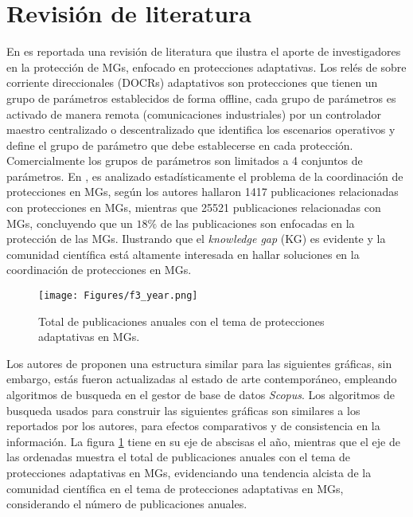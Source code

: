 \documentclass[journal,article,submit,pdftex,moreauthors]{Definitions/mdpi}
\begin{document}
\section{Revisión de literatura}

En \cite{damanjani_statistics-based_2021} es reportada una revisión de literatura que ilustra el aporte de investigadores en la protección de MGs, enfocado en protecciones adaptativas. Los relés de sobre corriente direccionales (DOCRs) adaptativos son protecciones que tienen un grupo de parámetros establecidos de forma offline, cada grupo de parámetros es activado de manera remota (comunicaciones industriales) por un controlador maestro centralizado o descentralizado que identifica los escenarios operativos y define el grupo de parámetro que debe establecerse en cada protección. Comercialmente los grupos de parámetros son limitados a 4 conjuntos de parámetros. En \cite{damanjani_statistics-based_2021}, es analizado estadísticamente el problema de la coordinación de protecciones en MGs, según los autores hallaron 1417 publicaciones relacionadas con protecciones en MGs, mientras que 25521 publicaciones relacionadas con MGs, concluyendo que un $18\%$ de las publicaciones son enfocadas en la protección de las MGs. Ilustrando que el \textit{knowledge gap} (KG) es evidente y la comunidad científica está altamente interesada en hallar soluciones en la coordinación de protecciones en MGs.

\begin{figure}[H]
    \centering
    \texttt{[image: Figures/f3\_year.png]}
    \caption{Total de publicaciones anuales con el tema de protecciones adaptativas en MGs.}
    \label{fig:rvw_year}
\end{figure}
\unskip

Los autores de \cite{damanjani_statistics-based_2021} proponen una estructura similar para las siguientes gráficas, sin embargo, estás fueron actualizadas al estado de arte contemporáneo, empleando algoritmos de busqueda en el gestor de base de datos \textit{Scopus}. Los algoritmos de busqueda usados para construir las siguientes gráficas son similares a los reportados por los autores, para efectos comparativos y de consistencia en la información. La figura \ref{fig:rvw_year} tiene en su eje de abscisas el año, mientras que el eje de las ordenadas muestra el total de publicaciones anuales con el tema de protecciones adaptativas en MGs, evidenciando una tendencia alcista de la comunidad científica en el tema de protecciones adaptativas en MGs, considerando el número de publicaciones anuales.
\end{document}
